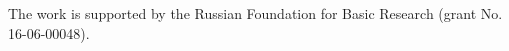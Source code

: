 



\vspace*{-22pt}

\Ack

\vspace*{-2pt}

\noindent
The work is supported by the Russian Foundation for Basic Research (grant 
No.\,16-06-00048).


\vspace*{-5pt}

  \begin{multicols}{2}

\renewcommand{\bibname}{\protect\rmfamily References}

{\small\frenchspacing
 {%
 \begin{thebibliography}{99}
 
 \vspace*{-2pt}
  

\end{thebibliography}}}
\end{multicols}
